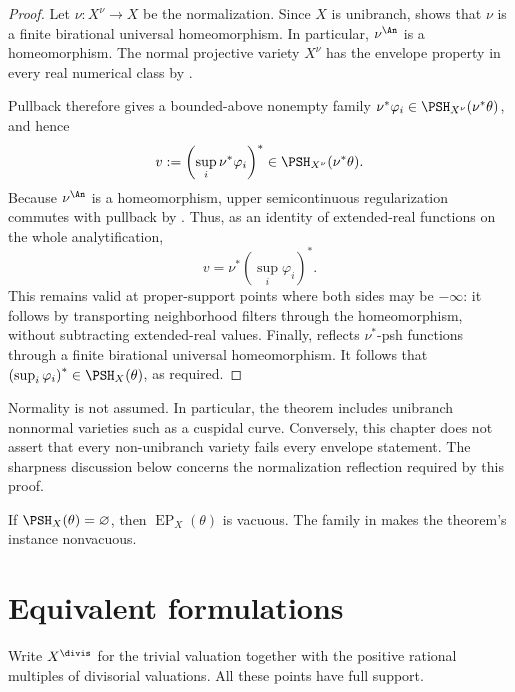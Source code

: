 \begin{proof}
Let $\nu:X^\nu\to X$ be the normalization.  Since $X$ is
unibranch,  shows that
$\nu$ is a finite birational universal homeomorphism.  In particular,
$\nu^{\An}$ is a homeomorphism.  The normal projective variety $X^\nu$
has the envelope property in every real numerical class by
.

Pullback therefore gives a bounded-above nonempty family
$\nu^*\varphi_i\in\PSH_{X^\nu}(\nu^*\theta)$, and hence
\[
 v:=\left(\sup_i\nu^*\varphi_i\right)^*
       \in\PSH_{X^\nu}(\nu^*\theta).
\]
Because $\nu^{\An}$ is a homeomorphism, upper semicontinuous
regularization commutes with pullback by
.  Thus, as an identity of extended-real
functions on the whole analytification,
\[
 v
 =\nu^*\left(\sup_i\varphi_i\right)^*.
\]
This remains valid at proper-support points where both sides may be
$-\infty$: it follows by transporting neighborhood filters through the
homeomorphism, without subtracting extended-real values.  Finally,
 reflects
$\nu^*$-psh functions through a finite birational universal
homeomorphism.  It follows that
$\left(\sup_i\varphi_i\right)^*\in\PSH_X(\theta)$, as required.
\end{proof}

\begin{remark}
\label{rem:ch37-logical-scope}
Normality is not assumed.  In particular, the theorem includes unibranch
nonnormal varieties such as a cuspidal curve.  Conversely, this chapter
does not assert that every non-unibranch variety fails every envelope
statement.  The sharpness discussion below concerns the normalization
reflection required by this proof.
\end{remark}

\begin{remark}
\label{rem:ch37-empty-psh-classes}
If $\PSH_X(\theta)=\varnothing$, then
$\operatorname{EP}_X(\theta)$ is vacuous.  The family in
 makes the theorem's instance nonvacuous.
\end{remark}

\section{Equivalent formulations}

Write $X^{\divis}$ for the trivial valuation together with the positive
rational multiples of divisorial valuations.  All these points have full
support.

